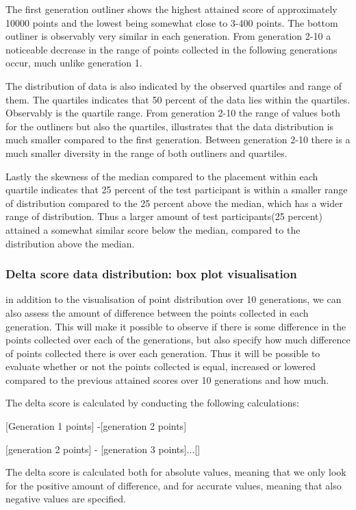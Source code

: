 The first generation outliner shows the highest attained score of approximately 10000 points and the lowest being somewhat close to 3-400 points. The bottom outliner is observably very similar in each generation. From generation 2-10 a noticeable  decrease in the range of points collected in the following generations occur, much unlike generation 1.

The distribution of data is also indicated by the observed quartiles and range of them. The quartiles indicates that 50 percent of the data lies within the quartiles. Observably is the quartile range. From generation 2-10 the range of values both for the outliners but also the quartiles, illustrates that the data distribution is much smaller compared to the first generation. Between generation 2-10 there is a much smaller diversity in the range of both outliners and quartiles.

Lastly the skewness of the median compared to the placement within each quartile indicates that 25 percent of the test participant is within a smaller range of distribution compared to the 25 percent above the median, which has a wider range of distribution. Thus a larger amount of test participants(25 percent) attained a somewhat similar score below the median, compared to the distribution above the median.

\subsubsection{Delta score data distribution: box plot visualisation}

in addition to the visualisation of point distribution over 10 generations, we can also assess the amount of difference between the points collected in each generation. This will make it possible to observe if there is some difference in the points collected over each of the generations, but also specify how much difference of points collected there is over each generation. Thus it will be possible to evaluate whether or not the points collected is equal, increased or lowered compared to the previous attained scores over 10 generations and how much.

The delta score is calculated by conducting the following calculations:

[Generation 1 points] -[generation 2 points]

[generation 2 points] - [generation 3 points]...[]

The delta score is calculated both for absolute values, meaning that we only look for the positive amount of difference, and for accurate values, meaning that also negative values are specified.

